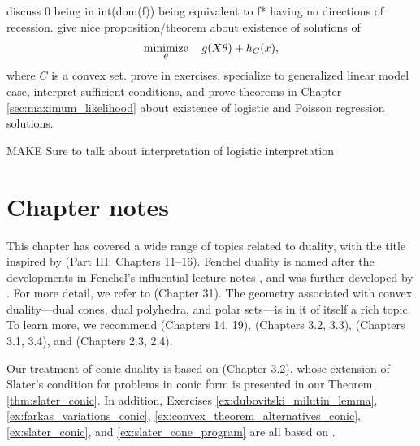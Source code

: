 discuss 0 being in int(dom(f)) being equivalent to f* having no directions
of recession.  give nice proposition/theorem about existence of solutions of 
$$
\operatorname*{minimize}_\theta \quad g(X \theta) + h_C(x),
$$
where $C$ is a convex set. prove in exercises. specialize to generalized linear
model case, interpret sufficient conditions, and prove theorems in Chapter
\ref{sec:maximum_likelihood} about existence of logistic and Poisson regression
solutions. 


MAKE Sure to talk about interpretation of logistic interpretation

\SkipTocEntry\section*{Chapter notes}

This chapter has covered a wide range of topics related to duality, with the
title inspired by \cite{rockafellar1970convex} (Part III: Chapters 11--16). 
Fenchel duality is named after the developments in Fenchel's influential lecture
notes \cite{fenchel1951convex}, and was further developed by
\cite{rockafellar1963convex}. For more detail, we refer to
\cite{rockafellar1970convex} (Chapter 31). The geometry associated with convex 
duality---dual cones, dual polyhedra, and polar sets---is in it of itself a rich
topic. To learn more, we recommend \cite{rockafellar1970convex} (Chapters 14,
19), \cite{bertsekas2009convex} (Chapters 3.2, 3.3), \cite{grunbaum2003convex}  
(Chapters 3.1, 3.4), and \cite{ziegler1995lectures} (Chapters 2.3, 2.4).       

Our treatment of conic duality is based on \cite{bental2023convex} (Chapter
3.2), whose extension of Slater's condition for problems in conic form is
presented in our Theorem \ref{thm:slater_conic}. In addition, Exercises
\ref{ex:dubovitski_milutin_lemma}, \ref{ex:farkas_variations_conic}, 
\ref{ex:convex_theorem_alternatives_conic}, \ref{ex:slater_conic}, and   
\ref{ex:slater_cone_program} are all based on \cite{bental2023convex}. 

\clearpage

